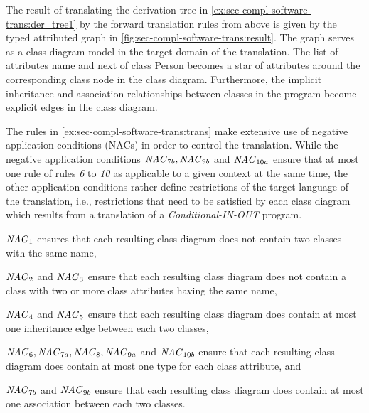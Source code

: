 \begin{example}
The result of translating the derivation tree in \cref{ex:sec-compl-software-trans:der_tree1} by the forward translation rules from above is given by the typed attributed graph in \cref{fig:sec-compl-software-trans:result}.
The graph serves as a class diagram model in the target domain of the translation.
The list of attributes \textsf{name} and \textsf{next} of class \textsf{Person} becomes a star of attributes around the corresponding class node in the class diagram.
Furthermore, the implicit inheritance and association relationships between classes in the program become explicit edges in the class diagram.
\envEndMarker
\end{example}

\begin{remark}
The rules in \cref{ex:sec-compl-software-trans:trans} make extensive use of negative application conditions (NACs) in order to control the translation.
While the negative application conditions $\mathit{NAC}_{7b},\mathit{NAC}_{9b}$ and $\mathit{NAC}_{10a}$ ensure that at most one rule of rules \textit{6} to \textit{10} as applicable to a given context at the same time, the other application conditions rather define restrictions of the target language of the translation, i.e., restrictions that need to be satisfied by each class diagram which results from a translation of a \textit{Conditional-IN-OUT} program.
\begin{enumerate*}
\item $\mathit{NAC}_1$ ensures that each resulting class diagram does not contain two classes with the same name,
\item $\mathit{NAC}_2$ and $\mathit{NAC}_3$ ensure that each resulting class diagram does not contain a class with two or more class attributes having the same name,
\item $\mathit{NAC}_4$ and $\mathit{NAC}_5$ ensure that each resulting class diagram does contain at most one inheritance edge between each two classes,
\item $\mathit{NAC}_6,\mathit{NAC}_{7a},\mathit{NAC}_8,\mathit{NAC}_{9a}$ and $\mathit{NAC}_{10b}$ ensure that each resulting class diagram does contain at most one type for each class attribute, and
\item $\mathit{NAC}_{7b}$ and $\mathit{NAC}_{9b}$ ensure that each resulting class diagram does contain at most one association between each two classes. \envEndMarker
\end{enumerate*}
\end{remark}